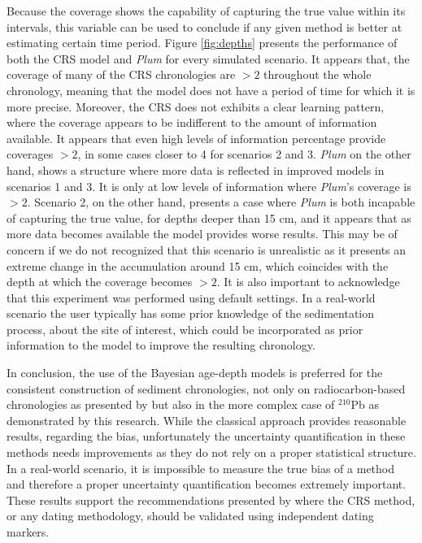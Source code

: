\documentclass [10pt] {article}
\begin{document}
Because the coverage shows the capability of capturing the true value within its intervals, this variable can be used to conclude if any given method is better at estimating certain time period.
Figure \ref{fig:depths} presents the performance of both the CRS model and \textit{Plum} for every simulated scenario.
It appears that, the coverage of many of the CRS chronologies are $> 2$ throughout the whole chronology, meaning that the model does not have a period of time for which it is more precise. 
Moreover, the CRS does not exhibits a clear learning pattern, where the coverage appears to be indifferent to the amount of information available.
It appears that even high levels of information percentage provide coverages $> 2$, in some cases closer to 4 for scenarios 2 and 3.
\textit{Plum} on the other hand, shows a structure where more data is reflected in improved models in scenarios 1 and 3.
It is only at low levels of information where \textit{Plum}'s coverage is $>2$.
Scenario 2, on the other hand, presents a case where \textit{Plum} is both incapable of capturing the true value, for depths deeper than 15 cm, and it appears that as more data becomes available the model provides worse results. 
This may be of concern if we do not recognized that this scenario is unrealistic as it presents an extreme change in the accumulation around 15 cm, which coincides with the depth at which the coverage becomes $>2$.
It is also important to acknowledge that this experiment was performed using default settings.  
In a real-world scenario the user typically has some prior knowledge of the sedimentation process, about the site of interest, which could be incorporated as prior information to the model to improve the resulting chronology.


In conclusion, the use of the Bayesian age-depth models is preferred for the consistent construction of sediment chronologies, not only on radiocarbon-based chronologies as presented by \citet{Blaauw2018} but also in the more complex case of $^{210}$Pb as demonstrated by this research.
While the classical approach provides reasonable results, regarding the bias, unfortunately the uncertainty quantification in these methods needs improvements as they do not rely on a proper statistical structure. 
In a real-world scenario, it is impossible to measure the true bias of a method and therefore a proper uncertainty quantification becomes extremely important.
These results support the recommendations presented by \citet{Smith2001,Barsanti2020} where the CRS method, or any dating methodology, should be validated using independent dating markers. 
\end{document}
